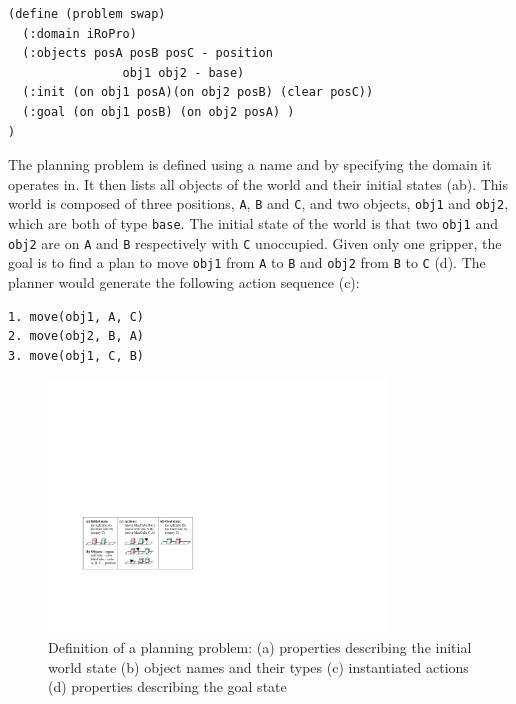 \begin{verbatim}
(define (problem swap)
  (:domain iRoPro)
  (:objects posA posB posC - position
                obj1 obj2 - base)
  (:init (on obj1 posA)(on obj2 posB) (clear posC))
  (:goal (on obj1 posB) (on obj2 posA) )
)
\end{verbatim}

The planning problem is defined using a name and by specifying the domain it operates in.
It then lists all objects of the world and their initial states (ab). 
This world is composed of three positions, \texttt{A}, \texttt{B} and \texttt{C}, and two objects, \texttt{obj1} and \texttt{obj2}, which are both of type \texttt{base}. 
The initial state of the world is that two \texttt{obj1} and \texttt{obj2} are on \texttt{A} and \texttt{B} respectively with \texttt{C} unoccupied.
Given only one gripper, the goal is to find a plan to move \texttt{obj1} from \texttt{A} to \texttt{B} and \texttt{obj2} from \texttt{B} to \texttt{C} (d). 
The planner would generate the following action sequence (c):
\begin{verbatim}
1. move(obj1, A, C)
2. move(obj2, B, A)
3. move(obj1, C, B)
\end{verbatim}

\begin{figure}[h]
	\centering
	\includegraphics[width=0.8\textwidth]{figures/planning-permutation}
	\caption{Definition of a planning problem: (a) properties describing the initial world state (b) object names and their types (c) instantiated actions (d) properties describing the goal state}
	\label{fig:planning problem}
\end{figure}

